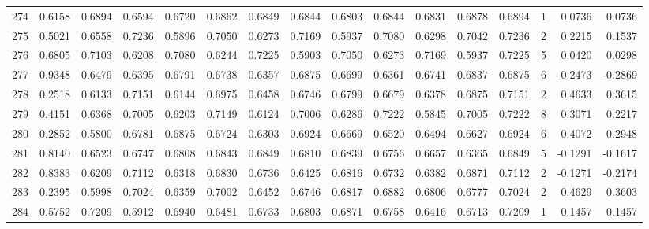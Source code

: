 \begin{tabular}{lrrrrrrrrrrrrrrr}
274 &      0.6158 &  0.6894 &  0.6594 &  0.6720 &  0.6862 &  0.6849 &  0.6844 &  0.6803 &  0.6844 &  0.6831 &   0.6878 &     0.6894 &      1 &                    0.0736 &                     0.0736 \\
275 &      0.5021 &  0.6558 &  0.7236 &  0.5896 &  0.7050 &  0.6273 &  0.7169 &  0.5937 &  0.7080 &  0.6298 &   0.7042 &     0.7236 &      2 &                    0.2215 &                     0.1537 \\
276 &      0.6805 &  0.7103 &  0.6208 &  0.7080 &  0.6244 &  0.7225 &  0.5903 &  0.7050 &  0.6273 &  0.7169 &   0.5937 &     0.7225 &      5 &                    0.0420 &                     0.0298 \\
277 &      0.9348 &  0.6479 &  0.6395 &  0.6791 &  0.6738 &  0.6357 &  0.6875 &  0.6699 &  0.6361 &  0.6741 &   0.6837 &     0.6875 &      6 &                   -0.2473 &                    -0.2869 \\
278 &      0.2518 &  0.6133 &  0.7151 &  0.6144 &  0.6975 &  0.6458 &  0.6746 &  0.6799 &  0.6679 &  0.6378 &   0.6875 &     0.7151 &      2 &                    0.4633 &                     0.3615 \\
279 &      0.4151 &  0.6368 &  0.7005 &  0.6203 &  0.7149 &  0.6124 &  0.7006 &  0.6286 &  0.7222 &  0.5845 &   0.7005 &     0.7222 &      8 &                    0.3071 &                     0.2217 \\
280 &      0.2852 &  0.5800 &  0.6781 &  0.6875 &  0.6724 &  0.6303 &  0.6924 &  0.6669 &  0.6520 &  0.6494 &   0.6627 &     0.6924 &      6 &                    0.4072 &                     0.2948 \\
281 &      0.8140 &  0.6523 &  0.6747 &  0.6808 &  0.6843 &  0.6849 &  0.6810 &  0.6839 &  0.6756 &  0.6657 &   0.6365 &     0.6849 &      5 &                   -0.1291 &                    -0.1617 \\
282 &      0.8383 &  0.6209 &  0.7112 &  0.6318 &  0.6830 &  0.6736 &  0.6425 &  0.6816 &  0.6732 &  0.6382 &   0.6871 &     0.7112 &      2 &                   -0.1271 &                    -0.2174 \\
283 &      0.2395 &  0.5998 &  0.7024 &  0.6359 &  0.7002 &  0.6452 &  0.6746 &  0.6817 &  0.6882 &  0.6806 &   0.6777 &     0.7024 &      2 &                    0.4629 &                     0.3603 \\
284 &      0.5752 &  0.7209 &  0.5912 &  0.6940 &  0.6481 &  0.6733 &  0.6803 &  0.6871 &  0.6758 &  0.6416 &   0.6713 &     0.7209 &      1 &                    0.1457 &                     0.1457 \\

\end{tabular}
